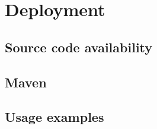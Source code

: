 \section{Deployment}
\label{Implementation:Deployment}

\subsection{Source code availability}
\label{Implementation:Deployment:Source}

\subsection{Maven}
\label{Implementation:Deployment:Maven}

\subsection{Usage examples}
\label{Implementation:Deployment:Examples}
